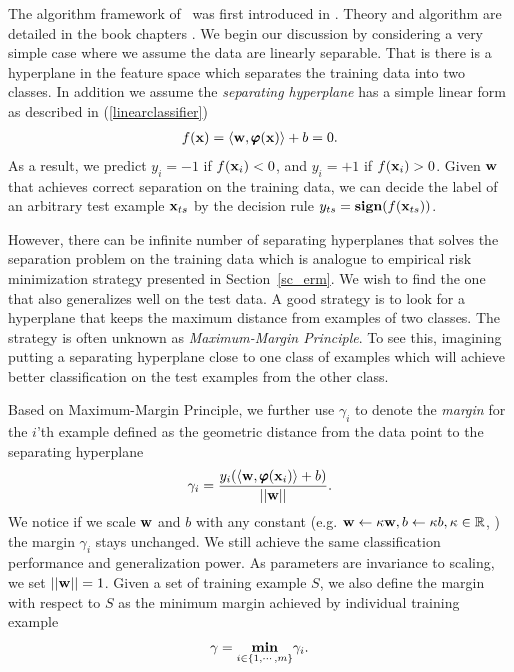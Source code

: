 {The algorithm framework of \svm\ was first introduced in \citep{Boser92,Cortes95support}.
Theory and algorithm are detailed in the book chapters \citep{Scholkopf02learning,taylor04,Bishop07}.
We begin our discussion by considering a very simple case where we assume the data are linearly separable.
That is there is a hyperplane in the feature space which separates the training data into two classes.
In addition we assume the \textit{separating hyperplane} has a simple linear form as described in (\ref{linearclassifier})
\begin{align*}
	f(\mathbf {x})=\langle \mathbf {w}, \pmb \varphi(\mathbf {x}) \rangle + b = 0.
\end{align*}
As a result, we predict $y_i=-1$ if $f(\mathbf {x}_i)<0$, and $y_i=+1$ if $f(\mathbf {x}_i)>0$.
Given $\mathbf {w}$ that achieves correct separation on the training data, we can decide the label of an arbitrary test example $\mathbf {x}_{ts}$ by the decision rule $y_{ts}=\textbf{sign}(f(\mathbf {x}_{ts}))$.

However, there can be infinite number of separating hyperplanes that solves the separation problem on the training data which is analogue to empirical risk minimization strategy presented in Section~\ref{sc_erm}. 
We wish to find the one that also generalizes well on the test data.
A good strategy is to look for a hyperplane that keeps the maximum distance from examples of two classes.
The strategy is often unknown as \textit{Maximum-Margin Principle}.
To see this, imagining putting a separating hyperplane close to one class of examples which will achieve better classification on the test examples from the other class.

Based on Maximum-Margin Principle, we further use $\gamma_i$ to denote the \textit{margin} for the $i$'th example defined as the geometric distance from the data point to the separating hyperplane
\begin{align*}
	\gamma_i = \frac{y_i(\langle \mathbf {w}, \pmb \varphi(\mathbf {x}_i) \rangle+b)}{\left|\left| \mathbf {w} \right|\right|}.
\end{align*}
We notice if we scale $\mathbf {w}$ and $b$ with any constant (e.g. $\mathbf {w}\leftarrow\kappa\mathbf {w}, b\leftarrow\kappa b, \kappa\in\mathbb{R}$, ) the margin $\gamma_i$ stays unchanged. 
We still achieve the same classification performance and generalization power.
As parameters are invariance to scaling, we set $\left|\left| \mathbf {w} \right|\right|=1$.
Given a set of training example $S$, we also define the margin with respect to $S$ as the minimum margin achieved by individual training example
\begin{align*}
	\gamma = \underset{i\in\{1,\cdots,m\}}{\textbf{min}}\gamma_i.
\end{align*}

}
